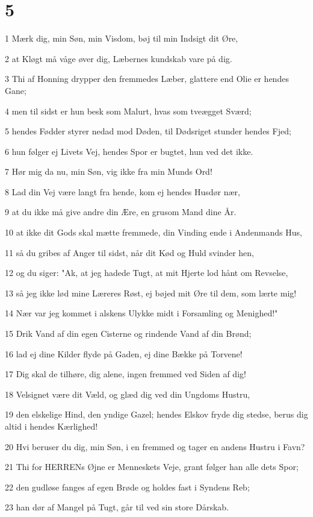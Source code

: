 \chapter{5}

\par 1 Mærk dig, min Søn, min Visdom, bøj til min Indsigt dit Øre,
\par 2 at Kløgt må våge øver dig, Læbernes kundskab vare på dig.
\par 3 Thi af Honning drypper den fremmedes Læber, glattere end Olie er hendes Gane;
\par 4 men til sidst er hun besk som Malurt, hvas som tveægget Sværd;
\par 5 hendes Fødder styrer nedad mod Døden, til Dødsriget stunder hendes Fjed;
\par 6 hun følger ej Livets Vej, hendes Spor er bugtet, hun ved det ikke.
\par 7 Hør mig da nu, min Søn, vig ikke fra min Munds Ord!
\par 8 Lad din Vej være langt fra hende, kom ej hendes Husdør nær,
\par 9 at du ikke må give andre din Ære, en grusom Mand dine År.
\par 10 at ikke dit Gods skal mætte fremmede, din Vinding ende i Andenmands Hus,
\par 11 så du gribes af Anger til sidst, når dit Kød og Huld svinder hen,
\par 12 og du siger: "Ak, at jeg hadede Tugt, at mit Hjerte lod hånt om Revselse,
\par 13 så jeg ikke lød mine Læreres Røst, ej bøjed mit Øre til dem, som lærte mig!
\par 14 Nær var jeg kommet i alskens Ulykke midt i Forsamling og Menighed!"
\par 15 Drik Vand af din egen Cisterne og rindende Vand af din Brønd;
\par 16 lad ej dine Kilder flyde på Gaden, ej dine Bække på Torvene!
\par 17 Dig skal de tilhøre, dig alene, ingen fremmed ved Siden af dig!
\par 18 Velsignet være dit Væld, og glæd dig ved din Ungdoms Hustru,
\par 19 den elskelige Hind, den yndige Gazel; hendes Elskov fryde dig stedse, berus dig altid i hendes Kærlighed!
\par 20 Hvi beruser du dig, min Søn, i en fremmed og tager en andens Hustru i Favn?
\par 21 Thi for HERRENs Øjne er Menneskets Veje, grant følger han alle dets Spor;
\par 22 den gudløse fanges af egen Brøde og holdes fast i Syndens Reb;
\par 23 han dør af Mangel på Tugt, går til ved sin store Dårskab.


